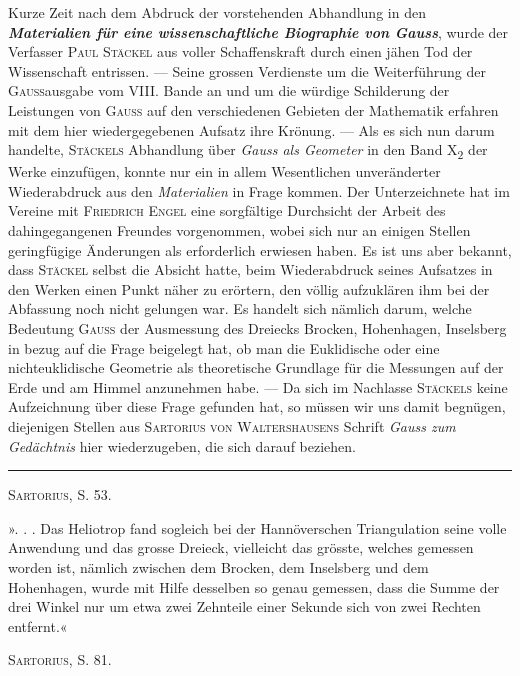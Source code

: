 \noindent\hspace*{\parindent}Kurze Zeit nach dem Abdruck der vorstehenden Abhandlung in den \textbf{\textit{Materialien für eine wissenschaftliche
Biographie von Gauss}}, wurde der Verfasser \textsc{Paul Stäckel} aus voller Schaffenskraft durch einen
jähen Tod der Wissenschaft entrissen. — Seine grossen Verdienste um die Weiterführung der \textsc{Gauss}ausgabe
vom VIII. Bande an und um die würdige Schilderung der Leistungen von \textsc{Gauss} auf den verschiedenen
Gebieten der Mathematik erfahren mit dem hier wiedergegebenen Aufsatz ihre Krönung. — Als es sich nun
darum handelte, \textsc{Stäckels} Abhandlung über \textit{Gauss als Geometer} in den Band X\textsubscript{2} der Werke einzufügen,
konnte nur ein in allem Wesentlichen unveränderter Wiederabdruck aus den \textit{Materialien} in Frage kommen.
Der Unterzeichnete hat im Vereine mit \textsc{Friedrich Engel} eine sorgfältige Durchsicht der Arbeit
des dahingegangenen Freundes vorgenommen, wobei sich nur an einigen Stellen geringfügige Änderungen
als erforderlich erwiesen haben. Es ist uns aber bekannt, dass \textsc{Stäckel} selbst die Absicht hatte, beim
Wiederabdruck seines Aufsatzes in den Werken einen Punkt näher zu erörtern, den völlig aufzuklären ihm
bei der Abfassung noch nicht gelungen war. Es handelt sich nämlich darum, welche Bedeutung \textsc{Gauss}
der Ausmessung des Dreiecks Brocken, Hohenhagen, Inselsberg in bezug auf die Frage beigelegt hat, ob
man die Euklidische oder eine nichteuklidische Geometrie als theoretische Grundlage für die Messungen
auf der Erde und am Himmel anzunehmen habe. — Da sich im Nachlasse \textsc{Stäckels} keine Aufzeichnung
über diese Frage gefunden hat, so müssen wir uns damit begnügen, diejenigen Stellen aus \textsc{Sartorius von
Waltershausens} Schrift \textit{Gauss zum Gedächtnis} hier wiederzugeben, die sich darauf beziehen.
\par\medskip\begin{center}\rule{.18\linewidth}{.3pt}\end{center}
\endgroup
\noindent\textsc{Sartorius}, S. 53.
\par
». . . Das Heliotrop fand sogleich bei der Hannöverschen Triangulation
seine volle Anwendung und das grosse Dreieck, vielleicht das grösste, welches
gemessen worden ist, nämlich zwischen dem Brocken, dem Inselsberg und dem
Hohenhagen, wurde mit Hilfe desselben so genau gemessen, dass die Summe
der drei Winkel nur um etwa zwei Zehnteile einer Sekunde sich von zwei
Rechten entfernt.«
\par\medskip\noindent\textsc{Sartorius}, S. 81.
